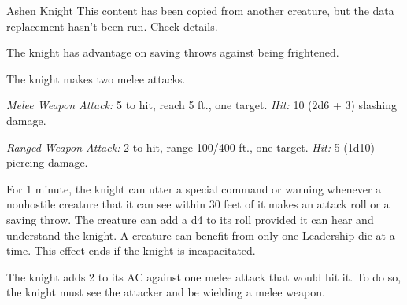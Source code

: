\documentclass[10pt,a4paper,twoside,bg=print,twocolumn,openany,nodeprecatedcode]{dndbook}
\begin{document}
\begin{DndMonster}[float=t]{Ashen Knight}
\DndMonsterBasics[
armor-class = {18 (\textit{plate armor})},
hit-points = {\DndDice{8d8 + 16}},
speed = {30 ft.}
]
\DndMonsterAbilityScores[
 str = 16,
 dex = 11,
 con = 14,
 int = 11,
 wis = 11,
 cha = 15
]
\DndMonsterDetails[
saving-throws = {Con +4, Wis +2},
languages = {any one language (usually Common)},
challenge = 3,
]
This content has been copied from another creature, but the data replacement hasn't been run. Check details.

The knight has advantage on saving throws against being frightened.

The knight makes two melee attacks.

\textsl{Melee Weapon Attack:} 5 to hit, reach 5 ft., one target. \textsl{Hit:} 10 (2d6 + 3) slashing damage.

\textsl{Ranged Weapon Attack:} 2 to hit, range 100/400 ft., one target. \textsl{Hit:} 5 (1d10) piercing damage.

For 1 minute, the knight can utter a special command or warning whenever a nonhostile creature that it can see within 30 feet of it makes an attack roll or a saving throw. The creature can add a d4 to its roll provided it can hear and understand the knight. A creature can benefit from only one Leadership die at a time. This effect ends if the knight is incapacitated.

The knight adds 2 to its AC against one melee attack that would hit it. To do so, the knight must see the attacker and be wielding a melee weapon.

\end{DndMonster}
\end{document}
